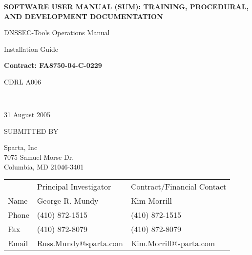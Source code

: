 \documentclass[12pt]{article}
\begin{document}

\begin{titlepage}

\vspace{.5in}

\begin{center}
\LARGE{\bf
SOFTWARE USER MANUAL (SUM):
TRAINING, PROCEDURAL, AND
DEVELOPMENT DOCUMENTATION
}
\vspace{1in}

\Large{
DNSSEC-Tools Operations Manual

Installation Guide
\vspace{0.5in}

{\bf Contract: FA8750-04-C-0229
\vspace{0.125in}

CDRL A006}\\
}
31 August 2005
\end{center}

\vspace{.5in}

SUBMITTED BY

Sparta, Inc\\
7075 Samuel Morse Dr.\\
Columbia, MD 21046-3401
\vspace{0.25in}

\begin{table}[hb]
\begin{tabular}{lll}
	& Principal Investigator	& Contract/Financial Contact\\
Name	& George R. Mundy		& Kim Morrill\\
Phone	& (410) 872-1515		& (410) 872-1515\\
Fax	& (410) 872-8079		& (410) 872-8079\\
Email	& Russ.Mundy@sparta.com		& Kim.Morrill@sparta.com\\
\end{tabular}
\end{table}

\end{titlepage}


\end{document}
